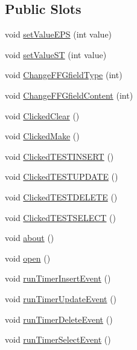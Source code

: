 \subsection*{\-Public \-Slots}
\begin{DoxyCompactItemize}
\item 
void \hyperlink{classMainWindow_aa58e3ed6d26ed5b593560bbf0f8f183c}{set\-Value\-E\-P\-S} (int value)
\item 
void \hyperlink{classMainWindow_a65c01e2454356623735a1ab596210304}{set\-Value\-S\-T} (int value)
\item 
void \hyperlink{classMainWindow_a75915c5f4286c3cdb3a7b0b3c240877a}{\-Change\-F\-F\-Gfield\-Type} (int)
\item 
void \hyperlink{classMainWindow_a22b08e83650062d966d3765b972fbc71}{\-Change\-F\-F\-Gfield\-Content} (int)
\item 
void \hyperlink{classMainWindow_a6e9f5e24aedd12d81b21148576a81b52}{\-Clicked\-Clear} ()
\item 
void \hyperlink{classMainWindow_a08902ba306b0d0aa85f02946edcb7a25}{\-Clicked\-Make} ()
\item 
void \hyperlink{classMainWindow_a2829d4a6fd7676b59809e9dd8f792fd6}{\-Clicked\-T\-E\-S\-T\-I\-N\-S\-E\-R\-T} ()
\item 
void \hyperlink{classMainWindow_a45d0243661d09bfc99392c94b0060060}{\-Clicked\-T\-E\-S\-T\-U\-P\-D\-A\-T\-E} ()
\item 
void \hyperlink{classMainWindow_a606b89316359652899d63d44b6cb86cf}{\-Clicked\-T\-E\-S\-T\-D\-E\-L\-E\-T\-E} ()
\item 
void \hyperlink{classMainWindow_a7908356fbc84a236502baf0f0bdbbe5c}{\-Clicked\-T\-E\-S\-T\-S\-E\-L\-E\-C\-T} ()
\item 
void \hyperlink{classMainWindow_a7be6a5d98970ac1a6296c6f9aee1e9bb}{about} ()
\item 
void \hyperlink{classMainWindow_aa7473e4bbbcc281706ac2edef864fb45}{open} ()
\item 
void \hyperlink{classMainWindow_a6532900ddf54d3587f12607a858cfff4}{run\-Timer\-Insert\-Event} ()
\item 
void \hyperlink{classMainWindow_ad751cceac9d285bd49518fccf7d7e018}{run\-Timer\-Update\-Event} ()
\item 
void \hyperlink{classMainWindow_a012e372e5d6180e36e3b08d27eaa6c36}{run\-Timer\-Delete\-Event} ()
\item 
void \hyperlink{classMainWindow_a124c316d7016496cbdc44a798cb26309}{run\-Timer\-Select\-Event} ()
\end{DoxyCompactItemize}

